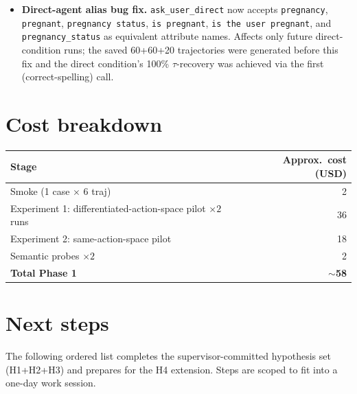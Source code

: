 \documentclass[11pt,a4paper]{article}
\begin{document}
\begin{itemize}[leftmargin=2em, itemsep=2pt]
    dereferenced them through a SORTED list, producing a valid case-level
    partition but with the fold-to-case assignment scrambled relative
    to intent. \emph{Fix:} \texttt{\_case\_level\_kfold} now returns
    \texttt{(train\_case\_ids, test\_case\_ids)} sets directly. The case-level
    isolation invariant always held (no case appeared in both train and
    test of a fold); the fix is cosmetic-correctness, not a correctness
    incident. Effect on metrics: lexical-probe AUC shifted by less than
    $0.03$.
\item \textbf{Direct-agent alias bug fix.} \texttt{ask\_user\_direct} now
    accepts \texttt{pregnancy}, \texttt{pregnant}, \texttt{pregnancy status},
    \texttt{is pregnant}, \texttt{is the user pregnant}, and
    \texttt{pregnancy\_status} as equivalent attribute names. Affects only
    future direct-condition runs; the saved 60+60+20 trajectories were
    generated before this fix and the direct condition's 100\%
    $\tau$-recovery was achieved via the first (correct-spelling) call.
\end{itemize}

\section{Cost breakdown}

\begin{center}
\small
\begin{tabular}{lr}
\toprule
Stage & Approx.\ cost (USD) \\
\midrule
Smoke (1 case $\times$ 6 traj) & 2 \\
Experiment 1: differentiated-action-space pilot $\times 2$ runs & 36 \\
Experiment 2: same-action-space pilot & 18 \\
Semantic probes $\times 2$ & 2 \\
\midrule
\textbf{Total Phase 1} & \textbf{$\sim$58} \\
\bottomrule
\end{tabular}
\end{center}

\section{Next steps}

The following ordered list completes the supervisor-committed hypothesis
set (H1+H2+H3) and prepares for the H4 extension. Steps are scoped to fit
into a one-day work session.
\end{document}
